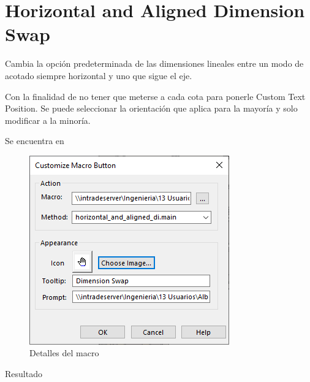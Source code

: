 \documentclass{report}
\begin{document}
\section{Horizontal and Aligned Dimension Swap}

Cambia la opción predeterminada de las dimensiones lineales entre un modo de acotado siempre horizontal y uno que sigue el eje. 

Con la finalidad de no tener que meterse a cada cota para ponerle Custom Text Position. Se puede seleccionar la orientación que aplica para la mayoría y solo modificar a la minoría.

Se encuentra en 

\begin{figure}[H]
	\centering
	\includegraphics[width=0.55\linewidth, height=0.5\textheight,keepaspectratio]{Imagenes/solidworks_macro_11}
	\caption{Detalles del macro}
	\label{fig:solidworksmacro11}
\end{figure}

{\LARGE Resultado}
\end{document}
